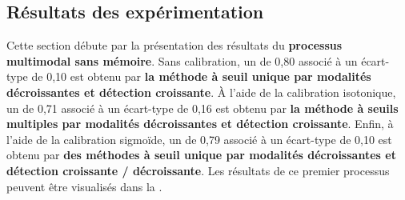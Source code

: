 \subsection{Résultats des expérimentation}
Cette section débute par la présentation des résultats du \textbf{processus multimodal sans mémoire}. Sans calibration, un \fscore{} de 0,80 associé à un écart-type de 0,10 est obtenu par \textbf{la méthode à seuil unique par modalités décroissantes et détection croissante}. À l'aide de la calibration isotonique, un \fscore{} de 0,71 associé à un écart-type de 0,16 est obtenu par \textbf{la méthode à seuils multiples par modalités décroissantes et détection croissante}. Enfin, à l'aide de la calibration sigmoïde, un \fscore{} de 0,79 associé à un écart-type de 0,10 est obtenu par \textbf{des méthodes à seuil unique par modalités décroissantes et détection croissante / décroissante}. Les résultats de ce premier processus peuvent être visualisés dans la .\par

